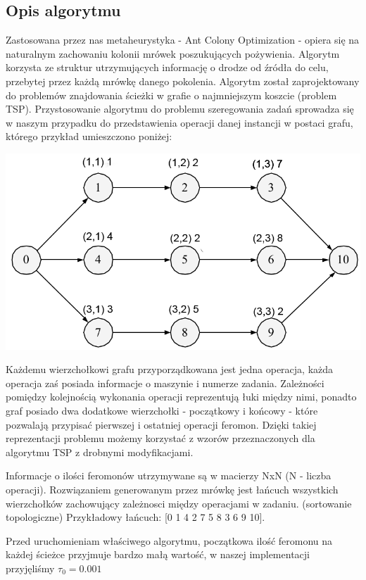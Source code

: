 \documentclass[10pt,a4paper]{article}
\begin{document}
\subsection{Opis algorytmu}
Zastosowana przez nas metaheurystyka - Ant Colony Optimization - opiera się na
naturalnym zachowaniu kolonii mrówek poszukujących pożywienia. Algorytm korzysta
ze struktur utrzymujących informację o drodze od źródła do celu, przebytej przez
każdą mrówkę danego pokolenia. Algorytm został zaprojektowany do problemów
znajdowania ścieżki w grafie o najmniejszym koszcie (problem TSP).
Przystosowanie algorytmu do problemu szeregowania zadań sprowadza się w naszym
przypadku do przedstawienia operacji danej instancji w postaci grafu, którego
przykład umieszczono poniżej:\\
\begin{center}
    \includegraphics [scale=0.4]{./figures/pic01.png}\\
\end{center}
Każdemu wierzchołkowi grafu przyporządkowana jest jedna operacja, każda operacja zaś posiada informacje o maszynie i numerze zadania.
Zależności pomiędzy kolejnością wykonania operacji reprezentują łuki między nimi, ponadto graf posiado dwa dodatkowe wierzchołki - początkowy i końcowy - które pozwalają przypisać pierwszej i ostatniej operacji feromon. Dzięki takiej reprezentacji problemu możemy korzystać z wzorów przeznaczonych dla algorytmu TSP z drobnymi modyfikacjami.

Informacje o ilości feromonów utrzymywane są w macierzy NxN (N - liczba
operacji). 
Rozwiązaniem generowanym przez mrówkę jest łańcuch wszystkich wierzchołków zachowujący zależnosci między operacjami w zadaniu.
(sortowanie topologiczne) Przykładowy łańcuch: [0 1 4 2 7 5 8 3 6 9 10].

Przed uruchomieniam właściwego algorytmu, początkowa ilość feromonu na każdej ścieżce przyjmuje bardzo małą wartość, w naszej implementacji przyjęliśmy $ \tau_0 = 0.001 $ 
\end{document}
